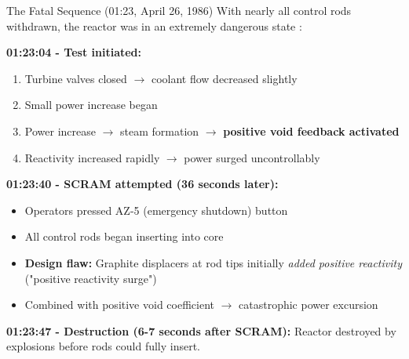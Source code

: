 \documentclass[aspectratio=169]{beamer}
\begin{document}
\begin{frame}[allowframebreaks]{The Fatal Sequence (01:23, April 26, 1986)}
    With nearly all control rods withdrawn, the reactor was in an extremely dangerous state \cite{malko2002chernobyl}:
    
    \vspace{0.5em}
    \textbf{01:23:04 - Test initiated:}
    \begin{enumerate}
        \item Turbine valves closed $\rightarrow$ coolant flow decreased slightly
        \item Small power increase began
        \item Power increase $\rightarrow$ steam formation $\rightarrow$ \textbf{positive void feedback activated}
        \item Reactivity increased rapidly $\rightarrow$ power surged uncontrollably
    \end{enumerate}
    
    \vspace{0.5em}
    \textbf{01:23:40 - SCRAM attempted (36 seconds later):}
    \begin{itemize}
        \item Operators pressed AZ-5 (emergency shutdown) button
        \item All control rods began inserting into core
        \item \textbf{Design flaw:} Graphite displacers at rod tips initially \textit{added positive reactivity} ("positive reactivity surge")
        \item Combined with positive void coefficient $\rightarrow$ catastrophic power excursion
    \end{itemize}
    
    \vspace{0.5em}
    \textbf{01:23:47 - Destruction (6-7 seconds after SCRAM):}
    Reactor destroyed by explosions before rods could fully insert.
\end{frame}
\end{document}
